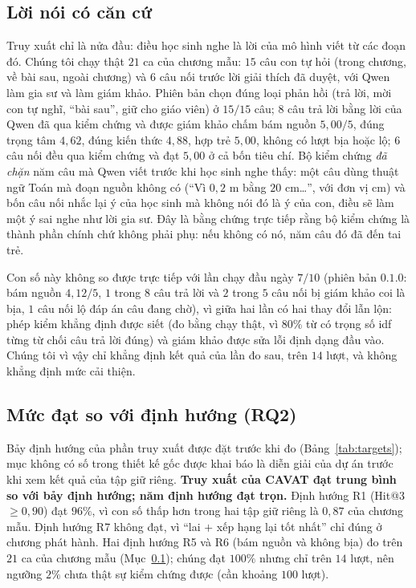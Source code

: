 \subsection{Lời nói có căn cứ}\label{sec:grounded-res}
Truy xuất chỉ là nửa đầu: điều học sinh nghe là lời của mô hình viết từ các đoạn đó. Chúng tôi chạy thật $21$ ca của chương mẫu: $15$ câu con tự hỏi (trong chương, về bài sau, ngoài chương) và $6$ câu nối trước lời giải thích đã duyệt, với Qwen làm gia sư và  làm giám khảo. Phiên bản  chọn đúng loại phản hồi (trả lời, mời con tự nghĩ, ``bài sau'', giữ cho giáo viên) ở $15/15$ câu; $8$ câu trả lời bằng lời của Qwen đã qua kiểm chứng và được giám khảo chấm bám nguồn $5{,}00/5$, đúng trọng tâm $4{,}62$, đúng kiến thức $4{,}88$, hợp trẻ $5{,}00$, không có lượt bịa hoặc lộ; $6$ câu nối đều qua kiểm chứng và đạt $5{,}00$ ở cả bốn tiêu chí. Bộ kiểm chứng \emph{đã chặn} năm câu mà Qwen viết trước khi học sinh nghe thấy: một câu dùng thuật ngữ Toán mà đoạn nguồn không có (``Vì $0{,}2$ m bằng $20$ cm\ldots'', với đơn vị cm) và bốn câu nối nhắc lại ý của học sinh mà không nói đó là ý của con, điều sẽ làm một ý sai nghe như lời gia sư. Đây là bằng chứng trực tiếp rằng bộ kiểm chứng là thành phần chính chứ không phải phụ: nếu không có nó, năm câu đó đã đến tai trẻ.

Con số này không so được trực tiếp với lần chạy đầu ngày $7/10$ (phiên bản $0.1.0$: bám nguồn $4{,}12/5$, $1$ trong $8$ câu trả lời và $2$ trong $5$ câu nối bị giám khảo coi là bịa, $1$ câu nối lộ đáp án câu đang chờ), vì giữa hai lần có hai thay đổi lẫn lộn: phép kiểm khẳng định được siết (đo bằng chạy thật, vì $80\%$ từ có trọng số idf từng từ chối câu trả lời đúng) và giám khảo được sửa lỗi định dạng đầu vào. Chúng tôi vì vậy chỉ khẳng định kết quả của lần đo sau, trên $14$ lượt, và không khẳng định mức cải thiện.

\subsection{Mức đạt so với định hướng (RQ2)}\label{sec:targets}
Bảy định hướng của phần truy xuất được đặt trước khi đo (Bảng~\ref{tab:targets}); mục không có số trong thiết kế gốc được khai báo là diễn giải của dự án trước khi xem kết quả của tập giữ riêng. \textbf{Truy xuất của CAVAT đạt trung bình \TargetMean{} so với bảy định hướng; năm định hướng đạt trọn.} Định hướng R1 (Hit@3 $\ge0{,}90$) đạt $96\%$, vì con số thấp hơn trong hai tập giữ riêng là $0{,}87$ của chương mẫu. Định hướng R7 không đạt, vì ``lai $+$ xếp hạng lại tốt nhất'' chỉ đúng ở chương phát hành. Hai định hướng R5 và R6 (bám nguồn và không bịa) đo trên $21$ ca của chương mẫu (Mục~\ref{sec:grounded-res}); chúng đạt $100\%$ nhưng chỉ trên $14$ lượt, nên ngưỡng $2\%$ chưa thật sự kiểm chứng được (cần khoảng $100$ lượt).

